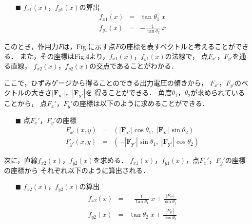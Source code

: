 \documentclass[twocolumn,a4j]{jsarticle}
\begin{document}
\begin{itemize}
    \item [$\blacksquare$] $f_{x1}\left(x\right)$，$f_{y1}\left(x\right)$の算出
          \begin{eqnarray*}
              f_{x1}\left(x\right) &=& \tan \theta_1 \; x\\
              f_{y1}\left(x\right) &=& - \frac{1}{\tan \theta_2}\; x
          \end{eqnarray*}
\end{itemize}

このとき，作用力$F$は，Fig.に示す点$F$の座標を表すベクトルと考えることができる．
また，その座標はFig.4より，$f_{x1}\left(x\right)$，$f_{y1}\left(x\right)$の法線で，
点$F_{x'}$，$F_{y'}$を通る直線，
$f_{x2}\left(x\right)$，$f_{y2}\left(x\right)$の交点であることがわかる．\par
ここで，ひずみゲージから得ることのできる出力電圧の傾きから，
$F_{x'}$，$F_{y'}$のベクトルの大きさ$|\boldsymbol{F_{x'}}|$，$|\boldsymbol{F_{y'}}|$を
得ることができる．
角度$\theta_1$，$\theta_2$が求められていることから，
点$F_x'$，$F_y'$の座標は以下のように求めることができる．

\begin{itemize}
    \item [$\blacksquare$] 点$F_x'$，$F_y'$の座標
          \begin{eqnarray*}
              F_{x'} \left(x ,y\right) &=& \left(|\boldsymbol{F_{x'}}| \cos \theta_1,\; |\boldsymbol{F_{x'}}| \sin \theta_2\right)\\
              F_{y'} \left(x ,y\right) &=& \left( - |\boldsymbol{F_{y'}}| \sin \theta_1,\; |\boldsymbol{F_{y'}}| \cos \theta_2\right)
          \end{eqnarray*}
\end{itemize}

次に，直線$f_{x2}\left(x\right)$，$f_{y2}\left(x\right)$を求める．
$f_{x1}\left(x\right)$，$f_{y1}\left(x\right)$，点$F_x'$，$F_y'$の座標の座標から
それぞれ以下のように算出される．

\begin{itemize}
    \item [$\blacksquare$] $f_{x2}\left(x\right)$，$f_{y2}\left(x\right)$の算出
          \begin{eqnarray*}
              f_{x2}\left(x\right) &=& - \frac{1}{\tan \theta_1} \; x + \frac{|F_{x'}|}{\sin \theta_1}\\
              f_{y2}\left(x\right) &=& \tan \theta_2\; x + \frac{|F_{y'}|}{\cos \theta_2}
          \end{eqnarray*}
\end{itemize}
\end{document}
